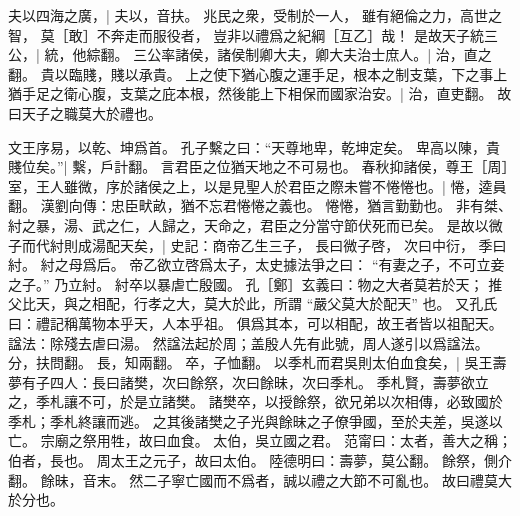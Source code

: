 夫以四海之廣，|{
	夫以，音扶。
}
兆民之衆，受制於一人，
雖有絕倫之力，高世之智，
莫［敢］不奔走而服役者，
豈非以禮爲之紀綱［互乙］哉！
是故天子統三公，|{
	統，他綜翻。
	}
三公率諸侯，諸侯制卿大夫，卿大夫治士庶人。|{
	治，直之翻。
	}
貴以臨賤，賤以承貴。
上之使下猶心腹之運手足，根本之制支葉，下之事上猶手足之衛心腹，支葉之庇本根，然後能上下相保而國家治安。|{
	治，直吏翻。
}
故曰天子之職莫大於禮也。


文王序易，以乾、坤爲首。
孔子繫之曰：“天尊地卑，乾坤定矣。
卑高以陳，貴賤位矣。”|{
	繫，戶計翻。}
言君臣之位猶天地之不可易也。
春秋抑諸侯，尊王［周］室，王人雖微，序於諸侯之上，以是見聖人於君臣之際未嘗不惓惓也。|{
	惓，逵員翻。
	漢劉向傳：忠臣畎畝，猶不忘君惓惓之義也。
	惓惓，猶言勤勤也。}
非有桀、紂之暴，湯、武之仁，人歸之，天命之，君臣之分當守節伏死而已矣。
是故以微子而代紂則成湯配天矣，|{
	史記：商帝乙生三子，
	長曰微子啓，
	次曰中衍，
	季曰紂。
	紂之母爲后。
	帝乙欲立啓爲太子，太史據法爭之曰：
	“有妻之子，不可立妾之子。”
	乃立紂。
	紂卒以暴虐亡殷國。
	孔［鄭］玄義曰：物之大者莫若於天；
	推父比天，與之相配，行孝之大，莫大於此，所謂 “嚴父莫大於配天” 也。
	又孔氏曰：禮記稱萬物本乎天，人本乎祖。
	俱爲其本，可以相配，故王者皆以祖配天。
	諡法：除殘去虐曰湯。
	然諡法起於周；盖殷人先有此號，周人遂引以爲諡法。
	分，扶問翻。
	長，知兩翻。
	卒，子恤翻。
}
以季札而君吳則太伯血食矣，|{
	吳王壽夢有子四人：長曰諸樊，次曰餘祭，次曰餘昧，次曰季札。
	季札賢，壽夢欲立之，季札讓不可，於是立諸樊。
	諸樊卒，以授餘祭，欲兄弟以次相傳，必致國於季札；季札終讓而逃。
	之其後諸樊之子光與餘昧之子僚爭國，至於夫差，吳遂以亡。
	宗廟之祭用牲，故曰血食。
	太伯，吳立國之君。
	范甯曰：太者，善大之稱；伯者，長也。
	周太王之元子，故曰太伯。
	陸德明曰：壽夢，莫公翻。
	餘祭，側介翻。
	餘昧，音末。
	}
然二子寧亡國而不爲者，誠以禮之大節不可亂也。
故曰禮莫大於分也。


